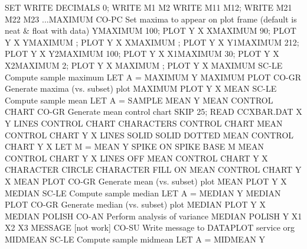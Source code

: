                                   SET WRITE DECIMALS 0; WRITE M1 M2
                                  WRITE M11 M12; WRITE M21 M22 M23
...MAXIMUM                  CO-PC Set maxima to appear on plot frame
                                  (default is neat & float with data)
                                  YMAXIMUM 100; PLOT Y X
                                  XMAXIMUM 90; PLOT Y X
                                  YMAXIMUM ; PLOT Y X
                                  XMAXIMUM ; PLOT Y X
                                  Y1MAXIMUM 212; PLOT Y X
                                  Y2MAXIMUM 100; PLOT Y X
                                  X1MAXIMUM 30; PLOT Y X
                                  X2MAXIMUM 2; PLOT Y X
                                  MAXIMUM ; PLOT Y X
MAXIMUM                     SC-LE Compute sample maximum
                                  LET A = MAXIMUM Y
MAXIMUM PLOT                CO-GR Generate maxima (vs. subset) plot
                                  MAXIMUM PLOT Y X
MEAN                        SC-LE Compute sample mean
                                  LET A = SAMPLE MEAN Y
MEAN CONTROL CHART          CO-GR Generate mean control chart
                                  SKIP 25; READ CCXBAR.DAT X Y
                                  LINES CONTROL CHART
                                  CHARACTERS CONTROL CHART
                                  MEAN CONTROL CHART Y X
                                  LINES SOLID SOLID DOTTED
                                  MEAN CONTROL CHART Y X
                                  LET M = MEAN Y
                                  SPIKE ON
                                  SPIKE BASE M
                                  MEAN CONTROL CHART Y X
                                  LINES OFF
                                  MEAN CONTROL CHART Y X
                                  CHARACTER CIRCLE
                                  CHARACTER FILL ON
                                  MEAN CONTROL CHART Y X
MEAN PLOT                   CO-GR Generate mean (vs. subset) plot
                                  MEAN PLOT Y X
MEDIAN                      SC-LE Compute sample median
                                  LET A = MEDIAN Y
MEDIAN PLOT                 CO-GR Generate median (vs. subset) plot
                                  MEDIAN PLOT Y X
MEDIAN POLISH               CO-AN Perform analysis of variance
                                  MEDIAN POLISH Y X1 X2 X3
MESSAGE      [not work]     CO-SU Write message to DATAPLOT service org
MIDMEAN                     SC-LE Compute sample midmean
                                  LET A = MIDMEAN Y
